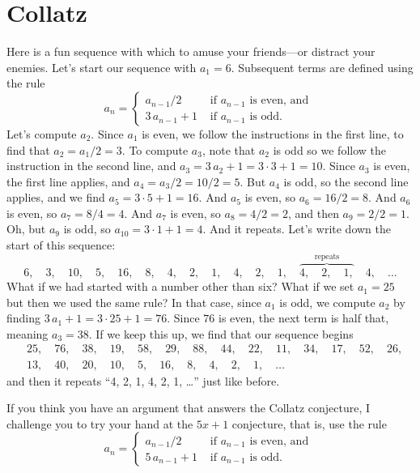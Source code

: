 \documentclass{ximera}
\begin{document}
\section{Collatz}


Here is a fun sequence with which to amuse your friends---or distract
your enemies.  Let's start our sequence with $a_1 = 6$.  Subsequent
terms are defined using the rule
$$
a_n = \begin{cases} a_{n-1} / 2 & \mbox{ if $a_{n-1}$ is even, and } \\
3 \, a_{n-1} + 1 & \mbox{ if $a_{n-1}$ is odd.}
\end{cases}
$$
Let's compute $a_2$.  Since $a_1$ is even, we follow the instructions
in the first line, to find that $a_2 = a_1/2 = 3$. To compute $a_3$,
note that $a_2$ is odd so we follow the instruction in the second
line, and $a_3 = 3 \, a_2 + 1 = 3 \cdot 3 + 1 = 10$.  Since $a_3$ is
even, the first line applies, and $a_4 = a_3 / 2 = 10 / 2 = 5$.  But
$a_4$ is odd, so the second line applies, and we find $a_5 = 3 \cdot 5
+ 1 = 16$.  And $a_5$ is even, so $a_6 = 16 / 2 = 8$.  And $a_6$ is
even, so $a_7 = 8/4 = 4$.  And $a_7$ is even, so $a_8 = 4 / 2 = 2$,
and then $a_9 = 2/2 = 1$.  Oh, but $a_9$ is odd, so $a_{10} = 3 \cdot
1 + 1 = 4$.  And it repeats.  Let's write down the start of this sequence:
$$
6,\quad %
3,\quad %
10,\quad  %
5,\quad  %
16,\quad  %
8,\quad  %
4,\quad  %
2,\quad  %
1,\quad  %
4,\quad %
2,\quad %
1,\quad %
\overbrace{4,\quad %
2,\quad %
1,}^{\mbox{repeats}}\quad %
4,\quad %
\ldots
$$
What if we had started with a number other than six?  What if we set
$a_1 = 25$ but then we used the same rule?  In that case, since $a_1$
is odd, we compute $a_2$ by finding $3 \, a_1 + 1 = 3 \cdot 25 + 1 =
76$.  Since $76$ is even, the next term is half that, meaning $a_3 =
38$.  If we keep this up, we find that our sequence begins
\begin{align*}
&25,\quad 76,\quad 38,\quad 19,\quad 58,\quad 29,\quad 88,\quad 44,\quad 22,\quad 11,\quad 34,\quad 17,\quad 52,\quad 26, \\
&13,\quad 40,\quad 20,\quad 10,\quad 5,\quad 16,\quad 8,\quad 4,\quad 2, \quad 1, \quad \ldots
\end{align*}
and then it repeats ``4, 2, 1, 4, 2, 1, \ldots'' just like before.

If you think you have an argument that answers the Collatz conjecture, I challenge you to try your hand at the $5x+1$ conjecture, that is, use the rule
\[
a_n = \displaystyle\begin{cases} a_{n-1} / 2 & \mbox{ if $a_{n-1}$ is even, and } \\
5 \, a_{n-1} + 1 & \mbox{ if $a_{n-1}$ is odd.}
\end{cases}
\]
\end{document}
